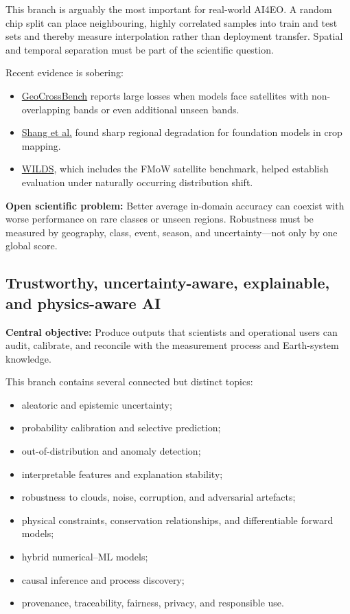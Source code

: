 \documentclass[
  a4paper,
  11pt]{article}
\providecommand{\tightlist}{%
  \setlength{\itemsep}{0pt}\setlength{\parskip}{0pt}}
\begin{document}
This branch is arguably the most important for real-world AI4EO. A
random chip split can place neighbouring, highly correlated samples into
train and test sets and thereby measure interpolation rather than
deployment transfer. Spatial and temporal separation must be part of the
scientific question.

Recent evidence is sobering:

\begin{itemize}
\tightlist
\item
  \href{https://arxiv.org/abs/2511.02831}{GeoCrossBench} reports large
  losses when models face satellites with non-overlapping bands or even
  additional unseen bands.
\item
  \href{https://arxiv.org/abs/2606.29664}{Shang et al.} found sharp
  regional degradation for foundation models in crop mapping.
\item
  \href{https://proceedings.mlr.press/v139/koh21a/koh21a.pdf}{WILDS},
  which includes the FMoW satellite benchmark, helped establish
  evaluation under naturally occurring distribution shift.
\end{itemize}

\textbf{Open scientific problem:} Better average in-domain accuracy can
coexist with worse performance on rare classes or unseen regions.
Robustness must be measured by geography, class, event, season, and
uncertainty---not only by one global score.

\hypertarget{trustworthy-uncertainty-aware-explainable-and-physics-aware-ai}{%
\subsection{Trustworthy, uncertainty-aware, explainable, and
physics-aware
AI}\label{trustworthy-uncertainty-aware-explainable-and-physics-aware-ai}}

\textbf{Central objective:} Produce outputs that scientists and
operational users can audit, calibrate, and reconcile with the
measurement process and Earth-system knowledge.

This branch contains several connected but distinct topics:

\begin{itemize}
\tightlist
\item
  aleatoric and epistemic uncertainty;
\item
  probability calibration and selective prediction;
\item
  out-of-distribution and anomaly detection;
\item
  interpretable features and explanation stability;
\item
  robustness to clouds, noise, corruption, and adversarial artefacts;
\item
  physical constraints, conservation relationships, and differentiable
  forward models;
\item
  hybrid numerical--ML models;
\item
  causal inference and process discovery;
\item
  provenance, traceability, fairness, privacy, and responsible use.
\end{itemize}
\end{document}
